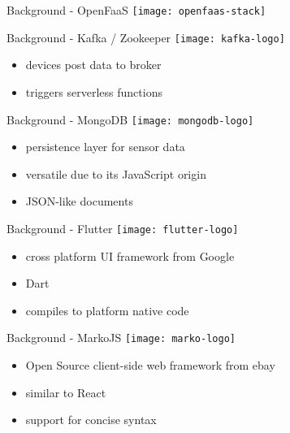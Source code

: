 \documentclass[aspectratio=1610]{beamer}
\begin{document}
  \begin{frame}{Background - OpenFaaS}
    \texttt{[image: openfaas-stack]}
  \end{frame}

  \begin{frame}{Background - Kafka / Zookeeper}
    \texttt{[image: kafka-logo]}

    \vspace*{1.5em}

    \begin{itemize}
      \item devices post data to broker
      \item triggers serverless functions
    \end{itemize}
  \end{frame}

  \begin{frame}{Background - MongoDB}
    \texttt{[image: mongodb-logo]}

    \vspace*{1.5em}

    \begin{itemize}
      \item persistence layer for sensor data
      \item versatile due to its JavaScript origin
      \item JSON-like documents
    \end{itemize}
  \end{frame}

  \begin{frame}{Background - Flutter}
    \texttt{[image: flutter-logo]}

    \vspace*{2em}

    \begin{itemize}
      \item cross platform UI framework from Google
      \item Dart
      \item compiles to platform native code
    \end{itemize}
  \end{frame}

  \begin{frame}{Background - MarkoJS}
    \texttt{[image: marko-logo]}

    \vspace*{2em}

    \begin{itemize}
      \item Open Source client-side web framework from ebay
      \item similar to React
      \item support for concise syntax
    \end{itemize}
  \end{frame}
\end{document}
